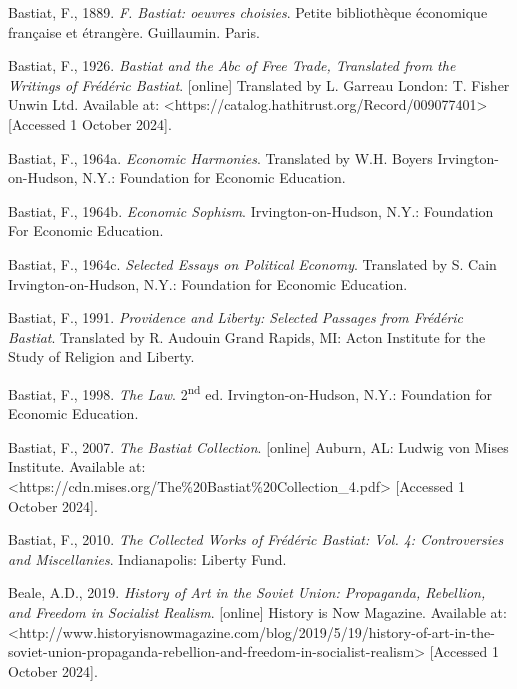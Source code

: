 Bastiat, F., 1889. \textit{F. Bastiat: oeuvres choisies}. Petite bibliothèque économique française et étrangère. Guillaumin. Paris.



Bastiat, F., 1926. \textit{Bastiat and the Abc of Free Trade, Translated from the Writings of Frédéric Bastiat}. [online] Translated by L. Garreau London: T. Fisher Unwin Ltd. Available at: {\textless}https://catalog.hathitrust.org/Record/009077401{\textgreater} [Accessed 1 October 2024].



Bastiat, F., 1964a. \textit{Economic Harmonies}. Translated by W.H. Boyers Irvington-on-Hudson, N.Y.: Foundation for Economic Education.



Bastiat, F., 1964b. \textit{Economic Sophism}. Irvington-on-Hudson, N.Y.: Foundation For Economic Education.



Bastiat, F., 1964c. \textit{Selected Essays on Political Economy}. Translated by S. Cain Irvington-on-Hudson, N.Y.: Foundation for Economic Education.



Bastiat, F., 1991. \textit{Providence and Liberty: Selected Passages from Frédéric Bastiat}. Translated by R. Audouin Grand Rapids, MI: Acton Institute for the Study of Religion and Liberty.



Bastiat, F., 1998. \textit{The Law}. 2\textsuperscript{nd} ed. Irvington-on-Hudson, N.Y.: Foundation for Economic Education.



Bastiat, F., 2007. \textit{The Bastiat Collection}. [online] Auburn, AL: Ludwig von Mises Institute. Available at: {\textless}https://cdn.mises.org/The\%20Bastiat\%20Collection\_4.pdf{\textgreater} [Accessed 1 October 2024].



Bastiat, F., 2010. \textit{The Collected Works of Frédéric Bastiat: Vol. 4: Controversies and Miscellanies}. Indianapolis: Liberty Fund.



Beale, A.D., 2019. \textit{History of Art in the Soviet Union: Propaganda, Rebellion, and Freedom in Socialist Realism}. [online] History is Now Magazine. Available at: {\textless}http://www.historyisnowmagazine.com/blog/2019/5/19/history-of-art-in-the-soviet-union-propaganda-rebellion-and-freedom-in-socialist-realism{\textgreater} [Accessed 1 October 2024].



